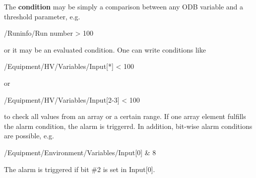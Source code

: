 The {\bfseries condition} may be simply a comparison between any ODB variable and a threshold parameter, e.g. 
\begin{DoxyCode}
 /Runinfo/Run number > 100
\end{DoxyCode}
 or it may be an evaluated condition. One can write conditions like 
\begin{DoxyCode}
  /Equipment/HV/Variables/Input[*] < 100
\end{DoxyCode}
 or 
\begin{DoxyCode}
  /Equipment/HV/Variables/Input[2-3] < 100
\end{DoxyCode}
 to check all values from an array or a certain range. If one array element fulfills the alarm condition, the alarm is triggerrd. In addition, bit-\/wise alarm conditions are possible, e.g. 
\begin{DoxyCode}
  /Equipment/Environment/Variables/Input[0] & 8
\end{DoxyCode}
 The alarm is triggered if bit \#2 is set in Input\mbox{[}0\mbox{]}.



